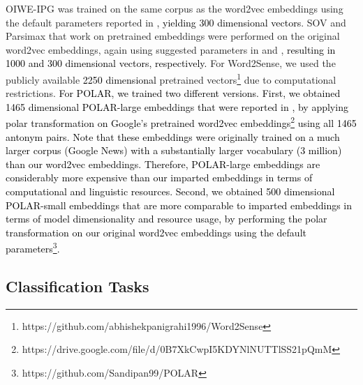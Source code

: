 \documentclass[11pt,a4paper]{article}
\begin{document}
 OIWE-IPG was trained on the same corpus as the word2vec embeddings using the default parameters reported in \citep{luo15online} \textcolor{black}{, yielding 300 dimensional vectors}. SOV and Parsimax that work on pretrained embeddings were performed on the original word2vec embeddings, again using suggested parameters in \citep{faruqui15sparse} and \citep{park17rotated}, \textcolor{black}{resulting in 1000 and 300 dimensional vectors, respectively.} For Word2Sense, we used the publicly available \textcolor{black}{2250 dimensional} pretrained vectors\footnote{https://github.com/abhishekpanigrahi1996/Word2Sense} due to computational restrictions. \textcolor{black}{For POLAR, we trained two different versions. First, we obtained 1465 dimensional POLAR-large embeddings that were reported in \citep{mathew20polar}, by applying polar transformation on Google's pretrained word2vec embeddings\footnote{https://drive.google.com/file/d/0B7XkCwpI5KDYNlNUTTlSS21pQmM} using all 1465 antonym pairs. Note that these embeddings were originally trained on a much larger corpus (Google News) with a substantially larger vocabulary (3 million) than our word2vec embeddings. Therefore, POLAR-large embeddings are considerably more expensive than our imparted embeddings in terms of computational and linguistic resources. Second, we obtained 500 dimensional POLAR-small embeddings that are more comparable to imparted embeddings in terms of model dimensionality and resource usage, by performing the polar transformation on our original word2vec embeddings using the default parameters\footnote{https://github.com/Sandipan99/POLAR}.} 
 
 
 
 
 
 
 

\subsection{Classification Tasks}
\label{app:clf_tasks}
\end{document}
